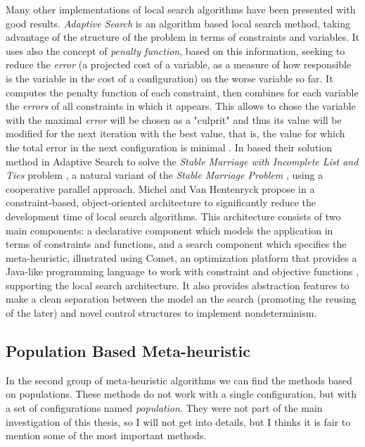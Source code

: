 Many other implementations of local search algorithms have been presented with good results. {\it Adaptive Search} is an algorithm based local search method, taking advantage of the structure of the problem in terms of constraints and variables. It uses also the concept of \textit{penalty function}, based on this information, seeking to reduce the \textit{error} (a projected cost of a variable, as a measure of how responsible is the variable in the cost of a configuration) on the worse variable so far. It computes the penalty function of each constraint, then combines for each variable the \textit{errors} of all constraints in which it appears. This allows to chose the variable with the maximal \textit{error} will be chosen as a "culprit" and thus its value will be modified for the next iteration with the best value, that is, the value for which the total error in the next configuration is minimal \cite{Diaz, Codognet2001, Caniou14}. In \cite{Munera2015}  based their solution method in Adaptive Search to solve the \textit{Stable Marriage with Incomplete List and Ties} problem \cite{Iwama1999}, a natural variant of the \textit{Stable Marriage Problem} \cite{Gale1962}, using a cooperative parallel approach. Michel and Van Hentenryck propose in \cite{Michel2002} a constraint-based, object-oriented architecture to significantly reduce the development time of local search algorithms. This architecture consists of two main components: a declarative component which models the application in terms of constraints and functions, and a search component which specifies the meta-heuristic, illustrated using {\sc Comet}, an optimization platform that provides a Java-like programming language to work with constraint and objective functions \cite{Comet, Michel2005}, supporting the local search architecture. It also provides abstraction features to make a clean separation between the model an the search (promoting the reusing of the later) and novel control structures to implement nondeterminism.

\subsection{Population Based Meta-heuristic}

In the second group of meta-heuristic algorithms we can find the methods based on populations. These methods do not work with a single configuration, but with a set of configurations named {\it population}. They were not part of the main investigation of this thesis, so I will not get into details, but I thinks it is fair to mention some of the most important methods.

